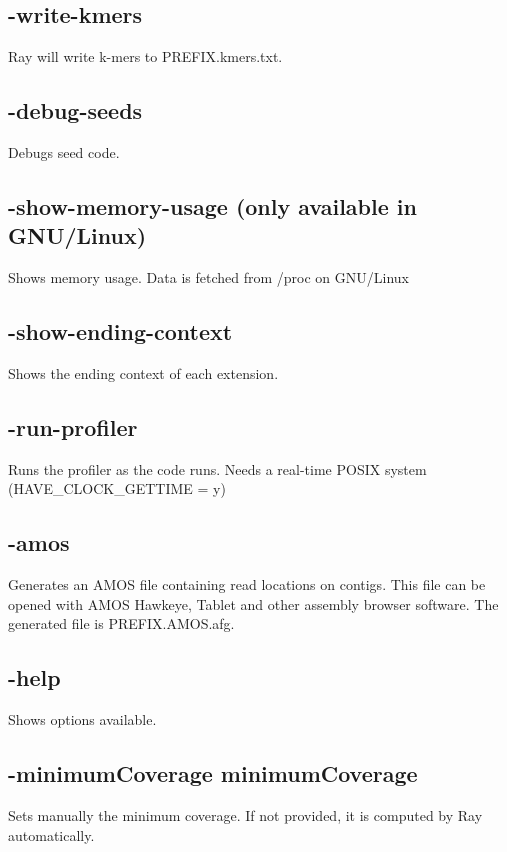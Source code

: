 \documentclass{article}
\begin{document}
\subsection{
-write-kmers
}
Ray will write k-mers to PREFIX.kmers.txt.

\subsection{      
       -debug-seeds
}
              Debugs seed code.

\subsection{      
       -show-memory-usage (only available in GNU/Linux)
}
              Shows memory usage. Data is fetched from /proc on GNU/Linux

\subsection{      
       -show-ending-context
}
              Shows the ending context of each extension.

\subsection{      
       -run-profiler
}
              Runs the profiler as the code runs. Needs a real-time POSIX system (HAVE\_CLOCK\_GETTIME = y)

\subsection{-amos}

Generates an AMOS file containing read locations on contigs. This file can be opened with AMOS Hawkeye, Tablet and other assembly browser
software. The generated file is PREFIX.AMOS.afg.



\subsection{
-help
}
Shows options available.


\subsection{-minimumCoverage minimumCoverage}

Sets manually the minimum coverage. 
If not provided, it is computed by Ray automatically.
\end{document}
